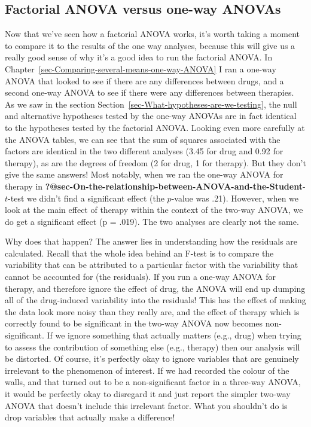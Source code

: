 \documentclass[
  a4paper,
]{book}
\begin{document}
\hypertarget{factorial-anova-versus-one-way-anovas}{%
\subsection{Factorial ANOVA versus one-way
ANOVAs}\label{factorial-anova-versus-one-way-anovas}}

Now that we've seen how a factorial ANOVA works, it's worth taking a
moment to compare it to the results of the one way analyses, because
this will give us a really good sense of why it's a good idea to run the
factorial ANOVA. In
Chapter~\ref{sec-Comparing-several-means-one-way-ANOVA} I ran a one-way
ANOVA that looked to see if there are any differences between drugs, and
a second one-way ANOVA to see if there were any differences between
therapies. As we saw in the section
Section~\ref{sec-What-hypotheses-are-we-testing}, the null and
alternative hypotheses tested by the one-way ANOVAs are in fact
identical to the hypotheses tested by the factorial ANOVA. Looking even
more carefully at the ANOVA tables, we can see that the sum of squares
associated with the factors are identical in the two different analyses
(3.45 for drug and 0.92 for therapy), as are the degrees of freedom (2
for drug, 1 for therapy). But they don't give the same answers! Most
notably, when we ran the one-way ANOVA for therapy in
\textbf{?@sec-On-the-relationship-between-ANOVA-and-the-Student}-\(t\)-test
we didn't find a significant effect (the \(p\)-value was .21). However,
when we look at the main effect of therapy within the context of the
two-way ANOVA, we do get a significant effect (p = .019). The two
analyses are clearly not the same.

Why does that happen? The answer lies in understanding how the residuals
are calculated. Recall that the whole idea behind an F-test is to
compare the variability that can be attributed to a particular factor
with the variability that cannot be accounted for (the residuals). If
you run a one-way ANOVA for therapy, and therefore ignore the effect of
drug, the ANOVA will end up dumping all of the drug-induced variability
into the residuals! This has the effect of making the data look more
noisy than they really are, and the effect of therapy which is correctly
found to be significant in the two-way ANOVA now becomes
non-significant. If we ignore something that actually matters (e.g.,
drug) when trying to assess the contribution of something else (e.g.,
therapy) then our analysis will be distorted. Of course, it's perfectly
okay to ignore variables that are genuinely irrelevant to the phenomenon
of interest. If we had recorded the colour of the walls, and that turned
out to be a non-significant factor in a three-way ANOVA, it would be
perfectly okay to disregard it and just report the simpler two-way ANOVA
that doesn't include this irrelevant factor. What you shouldn't do is
drop variables that actually make a difference!
\end{document}
